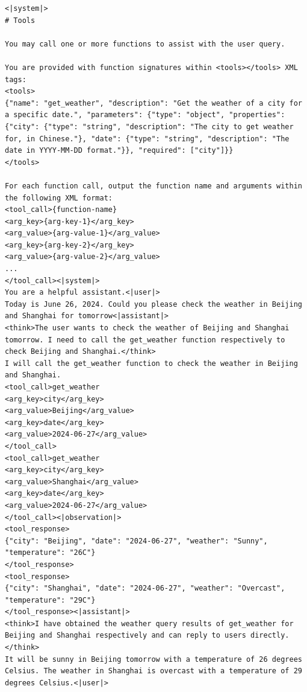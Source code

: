 \documentclass{article}
\theoremstyle{definition}
\begin{document}
\begin{tcolorbox}[left=0mm,right=0mm,top=0mm,bottom=0mm,boxsep=1mm,arc=0mm,boxrule=0pt, frame empty, breakable]
\scriptsize
\begin{lstlisting}
<|system|>
# Tools

You may call one or more functions to assist with the user query.

You are provided with function signatures within <tools></tools> XML tags:
<tools>
{"name": "get_weather", "description": "Get the weather of a city for a specific date.", "parameters": {"type": "object", "properties": {"city": {"type": "string", "description": "The city to get weather for, in Chinese."}, "date": {"type": "string", "description": "The date in YYYY-MM-DD format."}}, "required": ["city"]}}
</tools>

For each function call, output the function name and arguments within the following XML format:
<tool_call>{function-name}
<arg_key>{arg-key-1}</arg_key>
<arg_value>{arg-value-1}</arg_value>
<arg_key>{arg-key-2}</arg_key>
<arg_value>{arg-value-2}</arg_value>
...
</tool_call><|system|>
You are a helpful assistant.<|user|>
Today is June 26, 2024. Could you please check the weather in Beijing and Shanghai for tomorrow<|assistant|>
<think>The user wants to check the weather of Beijing and Shanghai tomorrow. I need to call the get_weather function respectively to check Beijing and Shanghai.</think>
I will call the get_weather function to check the weather in Beijing and Shanghai.
<tool_call>get_weather
<arg_key>city</arg_key>
<arg_value>Beijing</arg_value>
<arg_key>date</arg_key>
<arg_value>2024-06-27</arg_value>
</tool_call>
<tool_call>get_weather
<arg_key>city</arg_key>
<arg_value>Shanghai</arg_value>
<arg_key>date</arg_key>
<arg_value>2024-06-27</arg_value>
</tool_call><|observation|>
<tool_response>
{"city": "Beijing", "date": "2024-06-27", "weather": "Sunny", "temperature": "26C"}
</tool_response>
<tool_response>
{"city": "Shanghai", "date": "2024-06-27", "weather": "Overcast", "temperature": "29C"}
</tool_response><|assistant|>
<think>I have obtained the weather query results of get_weather for Beijing and Shanghai respectively and can reply to users directly.</think>
It will be sunny in Beijing tomorrow with a temperature of 26 degrees Celsius. The weather in Shanghai is overcast with a temperature of 29 degrees Celsius.<|user|>
\end{lstlisting}
\end{tcolorbox}
\noindent\begin{minipage}{\textwidth}
\label{fig:fc-template}
\end{minipage}
\end{document}
